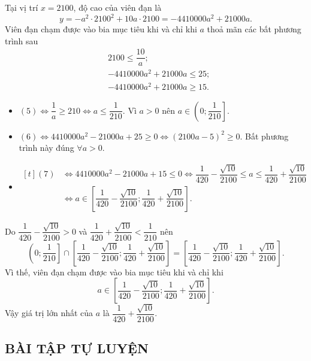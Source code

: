 \begin{vd}
{\begin{tikzpicture}[scale=1, font=\footnotesize, line join=round, line cap=round, >=stealth]
	\end{tikzpicture}}
	\loigiai
	{
		Tại vị trí $x=2100$, độ cao của viên đạn là
		\[y=-a^2\cdot 2100^2+10a\cdot 2100=-4410000a^2+21000a.\]
		Viên đạn chạm được vào bia mục tiêu khi và chỉ khi $a$ thoả mãn các bất phương trình sau
		\allowdisplaybreaks
		\begin{align*}
			&2100\leq\dfrac{10}{a} \tag{5}; \\
			&-4410000a^2+21000a\leq 25  \tag{6};\\
			&-4410000a^2+21000a\geq 15  \tag{7}.
		\end{align*}
		\begin{itemize}
			\item $(5)\Leftrightarrow\dfrac{1}{a}\geq 210\Leftrightarrow a\leq\dfrac{1}{210}$. Vì $a>0$ nên $a\in\left(0;\dfrac{1}{210}\right]$.
			\item $(6) \Leftrightarrow 4410000a^2-21000a+25\geq 0 \Leftrightarrow(2100a-5)^2\geq 0$. Bất phương trình này đúng $\forall a>0$.
			\item \allowdisplaybreaks
			$\begin{aligned}[t]
				(7)&\Leftrightarrow 4410000a^2-21000a+15\leq 0\Leftrightarrow\dfrac{1}{420}-\dfrac{\sqrt{10}}{2100}\leq a\leq\dfrac{1}{420}+\dfrac{\sqrt{10}}{2100}\\
				&\Leftrightarrow a\in\left[\dfrac{1}{420}-\dfrac{\sqrt{10}}{2100};\dfrac{1}{420}+\dfrac{\sqrt{10}}{2100}\right].
			\end{aligned}$
		\end{itemize}
		Do $\dfrac{1}{420}-\dfrac{\sqrt{10}}{2100}>0$ và $\dfrac{1}{420}+\dfrac{\sqrt{10}}{2100}<\dfrac{1}{210}$ nên
		\[\left(0;\dfrac{1}{210}\right]\cap\left[\dfrac{1}{420}-\dfrac{\sqrt{10}}{2100};\dfrac{1}{420}+\dfrac{\sqrt{10}}{2100}\right]=\left[\dfrac{1}{420}-\dfrac{\sqrt{10}}{2100};\dfrac{1}{420}+\dfrac{\sqrt{10}}{2100}\right].\]
		Vì thế, viên đạn chạm được vào bia mục tiêu khi và chỉ khi
		\[a\in\left[\dfrac{1}{420}-\dfrac{\sqrt{10}}{2100};\dfrac{1}{420}+\dfrac{\sqrt{10}}{2100}\right].\]
		Vậy giá trị lớn nhất của $a$ là $\dfrac{1}{420}+\dfrac{\sqrt{10}}{2100}$.
	}
\end{vd}


\subsection{BÀI TẬP TỰ LUYỆN}

